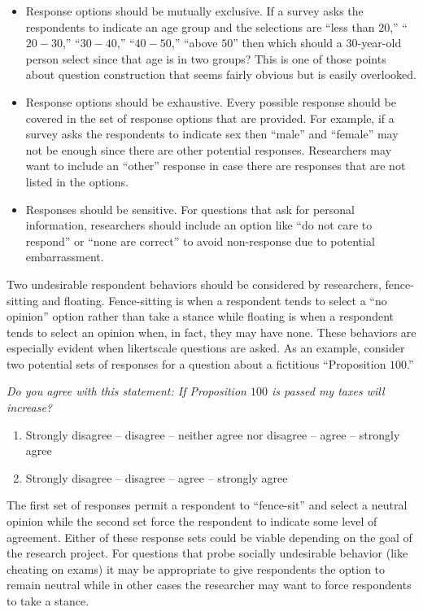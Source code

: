 \begin{itemize}
	\item Response options should be mutually exclusive. If a survey asks the respondents to indicate an age group and the selections are ``less than $ 20 $,'' ``$ 20-30 $,'' ``$ 30-40 $,'' ``$ 40-50 $,'' ``above $ 50 $'' then which should a $ 30 $-year-old person select since that age is in two groups? This is one of those points about question construction that seems fairly obvious but is easily overlooked. 

	\item Response options should be exhaustive. Every possible response should be covered in the set of response options that are provided. For example, if a survey asks the respondents to indicate sex then ``male'' and ``female'' may not be enough since there are other potential responses. Researchers may want to include an ``other'' response in case there are responses that are not listed in the options.
	
	\item Responses should be sensitive. For questions that ask for personal information, researchers should include an option like ``do not care to respond'' or ``none are correct'' to avoid non-response due to potential embarrassment.
\end{itemize}

Two undesirable respondent behaviors should be considered by researchers, fence-sitting and floating. Fence-sitting is when a respondent tends to select a ``no opinion'' option rather than take a stance while floating is when a respondent tends to select an opinion when, in fact, they may have none. These behaviors are especially evident when \gls{likertscale} questions are asked. As an example, consider two potential sets of responses for a question about a fictitious ``Proposition $ 100 $.''

\textit{Do you agree with this statement: If Proposition $ 100 $ is passed my taxes will increase?}

\begin{enumerate}
	\item Strongly disagree -- disagree -- neither agree nor disagree -- agree -- strongly agree
	\item Strongly disagree -- disagree -- agree -- strongly agree
\end{enumerate}

The first set of responses permit a respondent to ``fence-sit'' and select a neutral opinion while the second set force the respondent to indicate some level of agreement. Either of these response sets could be viable depending on the goal of the research project. For questions that probe socially undesirable behavior (like cheating on exams) it may be appropriate to give respondents the option to remain neutral while in other cases the researcher may want to force respondents to take a stance.

